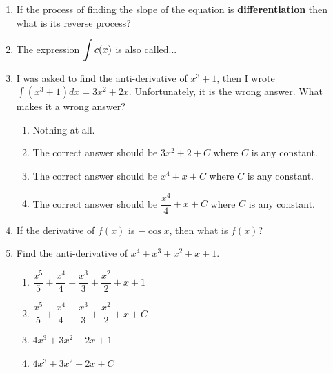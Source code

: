 \documentclass[10pt,paper=letter]{scrartcl}
\begin{document}
\begin{enumerate}[label=\arabic*.,font=\bfseries]

\item If the process of finding the slope of the equation is \textbf{differentiation} then what is its reverse process?


\item The expression $\mathlarger{\int c(x)}$ is also called...


\item I was asked to find the anti-derivative of $x^3 + 1$, then I wrote $\displaystyle{\int (x^3 + 1) dx} = 3x^2 + 2x$. Unfortunately, it is the wrong answer. What makes it a wrong answer?

\begin{enumerate}
    \item[(a)] Nothing at all. 
    \item[(b)] The correct answer should be $3x^2 + 2 + C$ where $C$ is any constant.
    \item[(c)] The correct answer should be $x^4 + x + C$ where $C$ is any constant.
    \item[(d)] The correct answer should be $\dfrac{x^4}{4} + x + C$ where $C$ is any constant.
\end{enumerate}

\item If the derivative of $f(x)$ is $-\cos x$, then what is $f(x)$?


\item Find the anti-derivative of $x^4 + x^3 + x^2 + x + 1.$

\begin{enumerate}
    \item[(a)] $\dfrac{x^5}{5}+ \dfrac{x^4}{4}+\dfrac{x^3}{3}+\dfrac{x^2}{2}+x + 1$
    
      \item[(b)] $\dfrac{x^5}{5}+ \dfrac{x^4}{4}+\dfrac{x^3}{3}+\dfrac{x^2}{2}+x + C$
      
      \item[(c)] $4x^3 + 3x^2 + 2x + 1$
      
      \item[(d)] $4x^3 + 3x^2 + 2x + C$
\end{enumerate}


\end{enumerate}
\end{document}
